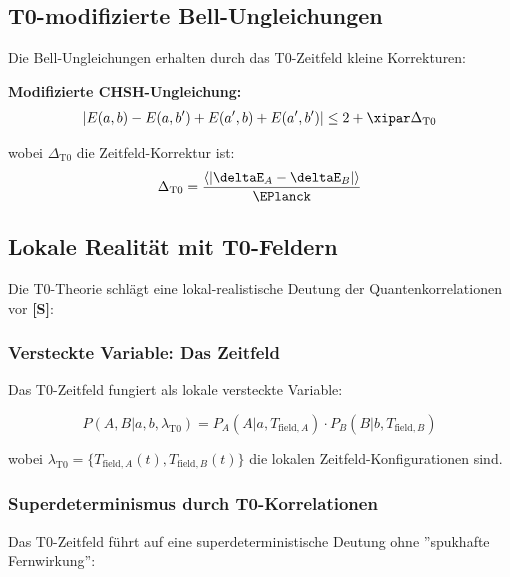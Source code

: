 	\subsection{T0-modifizierte Bell-Ungleichungen}
	
	Die Bell-Ungleichungen erhalten durch das T0-Zeitfeld kleine Korrekturen:
	
	\begin{tcolorbox}[colback=red!5!white,colframe=red!75!black,title=T0-Bell-Korrekturen]
		\textbf{Modifizierte CHSH-Ungleichung:}
		\begin{equation}
			|E(a,b) - E(a,b') + E(a',b) + E(a',b')| \leq 2 + \xipar \Delta_{\text{T0}}
		\end{equation}
		
		wobei $\Delta_{\text{T0}}$ die Zeitfeld-Korrektur ist:
		\begin{equation}
			\Delta_{\text{T0}} = \frac{\langle|\deltaE_A - \deltaE_B|\rangle}{\EPlanck}
		\end{equation}
	\end{tcolorbox}
	
	\subsection{Lokale Realität mit T0-Feldern}
	
	Die T0-Theorie schlägt eine lokal-realistische Deutung der Quantenkorrelationen vor \textbf{[S]}:
	
	\subsubsection{Versteckte Variable: Das Zeitfeld}
	
	Das T0-Zeitfeld fungiert als lokale versteckte Variable:
	
	\begin{equation}
		P(A,B|a,b,\lambda_{\text{T0}}) = P_A(A|a,T_{\text{field},A}) \cdot P_B(B|b,T_{\text{field},B})
	\end{equation}
	
	wobei $\lambda_{\text{T0}} = \{T_{\text{field},A}(t), T_{\text{field},B}(t)\}$ die lokalen Zeitfeld-Konfigurationen sind.
	
	\subsubsection{Superdeterminismus durch T0-Korrelationen}
	
	Das T0-Zeitfeld führt auf eine superdeterministische Deutung ohne ''spukhafte Fernwirkung'':
	

